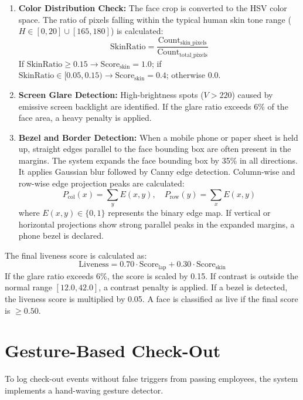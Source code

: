 \begin{enumerate}
\begin{itemize}
    \end{itemize}
    \item \textbf{Color Distribution Check:} The face crop is converted to the HSV color space. The ratio of pixels falling within the typical human skin tone range ($H \in [0, 20] \cup [165, 180]$) is calculated:
    \begin{equation}
        \text{SkinRatio} = \frac{\text{Count}_{\text{skin\_pixels}}}{\text{Count}_{\text{total\_pixels}}}
    \end{equation}
    If $\text{SkinRatio} \ge 0.15 \rightarrow \text{Score}_{\text{skin}} = 1.0$; if $\text{SkinRatio} \in [0.05, 0.15) \rightarrow \text{Score}_{\text{skin}} = 0.4$; otherwise $0.0$.
    \item \textbf{Screen Glare Detection:} High-brightness spots ($V > 220$) caused by emissive screen backlight are identified. If the glare ratio exceeds 6\% of the face area, a heavy penalty is applied.
    \item \textbf{Bezel and Border Detection:} When a mobile phone or paper sheet is held up, straight edges parallel to the face bounding box are often present in the margins. The system expands the face bounding box by 35\% in all directions. It applies Gaussian blur followed by Canny edge detection. Column-wise and row-wise edge projection peaks are calculated:
    \begin{equation}
        P_{\text{col}}(x) = \sum_{y} E(x, y), \quad P_{\text{row}}(y) = \sum_{x} E(x, y)
    \end{equation}
    where $E(x, y) \in \{0, 1\}$ represents the binary edge map. If vertical or horizontal projections show strong parallel peaks in the expanded margins, a phone bezel is declared.
\end{enumerate}
The final liveness score is calculated as:
\begin{equation}
    \text{Liveness} = 0.70 \cdot \text{Score}_{\text{lap}} + 0.30 \cdot \text{Score}_{\text{skin}}
\end{equation}
If the glare ratio exceeds 6\%, the score is scaled by 0.15. If contrast is outside the normal range $[12.0, 42.0]$, a contrast penalty is applied. If a bezel is detected, the liveness score is multiplied by 0.05. A face is classified as live if the final score is $\ge 0.50$.

\section{Gesture-Based Check-Out}
To log check-out events without false triggers from passing employees, the system implements a hand-waving gesture detector.


